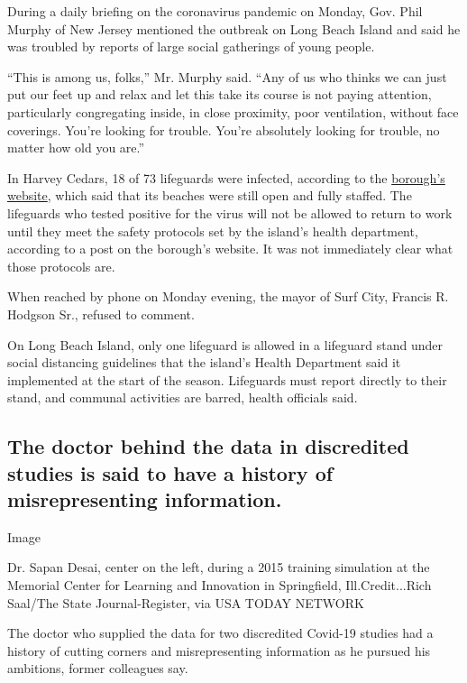 During a daily briefing on the coronavirus pandemic on Monday, Gov. Phil
Murphy of New Jersey mentioned the outbreak on Long Beach Island and
said he was troubled by reports of large social gatherings of young
people.

``This is among us, folks,'' Mr. Murphy said. ``Any of us who thinks we
can just put our feet up and relax and let this take its course is not
paying attention, particularly congregating inside, in close proximity,
poor ventilation, without face coverings. You're looking for trouble.
You're absolutely looking for trouble, no matter how old you are.''

In Harvey Cedars, 18 of 73 lifeguards were infected, according to the
\href{http://www.harveycedars.org/}{borough's website}, which said that
its beaches were still open and fully staffed. The lifeguards who tested
positive for the virus will not be allowed to return to work until they
meet the safety protocols set by the island's health department,
according to a post on the borough's website. It was not immediately
clear what those protocols are.

When reached by phone on Monday evening, the mayor of Surf City, Francis
R. Hodgson Sr., refused to comment.

On Long Beach Island, only one lifeguard is allowed in a lifeguard stand
under social distancing guidelines that the island's Health Department
said it implemented at the start of the season. Lifeguards must report
directly to their stand, and communal activities are barred, health
officials said.

\hypertarget{the-doctor-behind-the-data-in-discredited-studies-is-said-to-have-a-history-of-misrepresenting-information}{%
\subsection{The doctor behind the data in discredited studies is said to
have a history of misrepresenting
information.}\label{the-doctor-behind-the-data-in-discredited-studies-is-said-to-have-a-history-of-misrepresenting-information}}

Image

Dr. Sapan Desai, center on the left, during a 2015 training simulation
at the Memorial Center for Learning and Innovation in Springfield,
Ill.Credit...Rich Saal/The State Journal-Register, via USA TODAY NETWORK

The doctor who supplied the data for two discredited Covid-19 studies
had a history of cutting corners and misrepresenting information as he
pursued his ambitions, former colleagues say.

